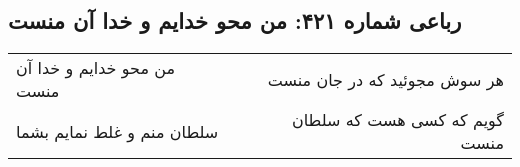 \begin{center}
\section*{رباعی شماره ۴۲۱: من محو خدایم و خدا آن منست}
\label{sec:0421}
\begin{longtable}{l p{0.5cm} r}
من محو خدایم و خدا آن منست
&&
هر سوش مجوئید که در جان منست
\\
سلطان منم و غلط نمایم بشما
&&
گویم که کسی هست که سلطان منست
\\
\end{longtable}
\end{center}
